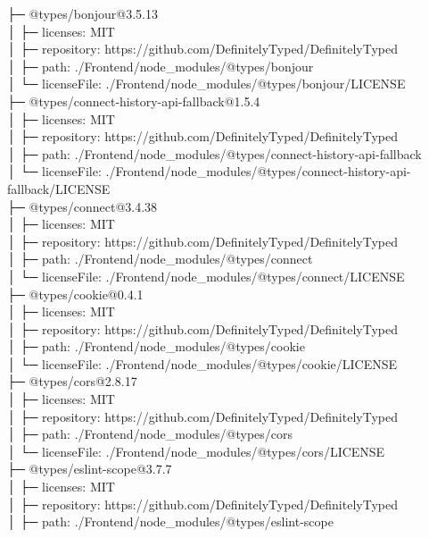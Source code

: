 ├─ @types/bonjour@3.5.13\\
│  ├─ licenses: MIT\\
│  ├─ repository: https://github.com/DefinitelyTyped/DefinitelyTyped\\
│  ├─ path: ./Frontend/node\_modules/@types/bonjour\\
│  └─ licenseFile: ./Frontend/node\_modules/@types/bonjour/LICENSE\\
├─ @types/connect-history-api-fallback@1.5.4\\
│  ├─ licenses: MIT\\
│  ├─ repository: https://github.com/DefinitelyTyped/DefinitelyTyped\\
│  ├─ path: ./Frontend/node\_modules/@types/connect-history-api-fallback\\
│  └─ licenseFile: ./Frontend/node\_modules/@types/connect-history-api-fallback/LICENSE\\
├─ @types/connect@3.4.38\\
│  ├─ licenses: MIT\\
│  ├─ repository: https://github.com/DefinitelyTyped/DefinitelyTyped\\
│  ├─ path: ./Frontend/node\_modules/@types/connect\\
│  └─ licenseFile: ./Frontend/node\_modules/@types/connect/LICENSE\\
├─ @types/cookie@0.4.1\\
│  ├─ licenses: MIT\\
│  ├─ repository: https://github.com/DefinitelyTyped/DefinitelyTyped\\
│  ├─ path: ./Frontend/node\_modules/@types/cookie\\
│  └─ licenseFile: ./Frontend/node\_modules/@types/cookie/LICENSE\\
├─ @types/cors@2.8.17\\
│  ├─ licenses: MIT\\
│  ├─ repository: https://github.com/DefinitelyTyped/DefinitelyTyped\\
│  ├─ path: ./Frontend/node\_modules/@types/cors\\
│  └─ licenseFile: ./Frontend/node\_modules/@types/cors/LICENSE\\
├─ @types/eslint-scope@3.7.7\\
│  ├─ licenses: MIT\\
│  ├─ repository: https://github.com/DefinitelyTyped/DefinitelyTyped\\
│  ├─ path: ./Frontend/node\_modules/@types/eslint-scope\\
